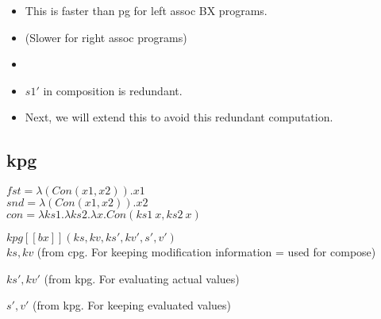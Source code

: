 \documentclass[runningheads]{llncs}
\newcommand{\xpg}[7]{kpg [\![#1]\!] (#2, #3, #4, #5, #6, #7)}
\begin{document}
\begin{itemize}
\item This is faster than pg for left assoc BX programs.
\item (Slower for right assoc programs)
\item []
\item $s1'$ in composition is redundant.  
\item Next, we will extend this to avoid this redundant computation.
\end{itemize}


\subsection{kpg}

$fst = \lambda (Con (x1, x2)). x1$\\
\noindent 
$snd = \lambda (Con (x1, x2)). x2$\\
$con = \lambda ks1. \lambda ks2. \lambda x. Con(ks1 \ x, ks2 \ x)$

\noindent 
$\xpg{bx}{ks}{kv}{ks'}{kv'}{s'}{v'}$\\

$ks, kv$ (from cpg. For keeping modification information = used for compose)

$ks', kv'$ (from kpg. For evaluating actual values)

$s', v'$ (from kpg. For keeping evaluated values)

\vspace{5mm}
\end{document}
